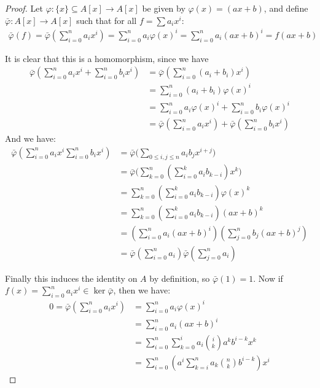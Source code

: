 \documentclass{article}
\theoremstyle{definition}
\theoremstyle{remark}
\theoremstyle{definition}
\begin{document}
    \begin{proof}
        Let $\varphi\colon \{x\}\subseteq A[x] \rightarrow A[x]$ be given by $\varphi(x) = (ax+b)$, and define $\bar\varphi\colon A[x]\rightarrow A[x]$ such that for all $f=\sum {a_i}x^i$:\begin{align}
            \bar\varphi(f) = \bar\varphi(\sum_{i=0}^n {a_i}x^i) = \sum_{i=0}^n {a_i}{\varphi(x)}^i = \sum_{i=0}^n {a_i}{(ax+b)}^i = f(ax+b)
        \end{align}

    It is clear that this is a homomorphism, since we have \begin{align}\bar\varphi(\sum_{i=0}^n {a_i}x^i + \sum_{i=0}^n {b_i}x^i) &= \bar\varphi(\sum_{i=0}^n ({a_i} + {b_i})x^i)\\
         &= \sum_{i=0}^n ({a_i} + {b_i}){\varphi(x)}^i\\
         &= \sum_{i=0}^n {a_i}{\varphi(x)}^i + \sum_{i=0}^n {b_i}{\varphi(x)}^i\\
         &= \bar\varphi(\sum_{i=0}^n {a_i}x^i) + \bar\varphi(\sum_{i=0}^n {b_i}x^i)
        \end{align}
And we have:\begin{align}
    \bar\varphi(\sum_{i=0}^n {a_i}x^i\sum_{i=0}^n {b_i}x^i) &= \bar\varphi\bigg(\sum_{0\leq i,j\leq n} {a_i}{b_j}x^{i+j}\bigg)\\
    &= \bar\varphi\bigg(\sum_{k=0}^n(\sum_{i=0}^k {a_i}b_{k-i}) x^k\bigg)\\
    &= \sum_{k=0}^n(\sum_{i=0}^k{a_i}{b_{k-i}}){\varphi(x)}^k\\
    &= \sum_{k=0}^n(\sum_{i=0}^k{a_i}{b_{k-i}}){(ax+b)}^k\\
    &= (\sum_{i=0}^n{a_i}{(ax+b)}^i)(\sum_{j=0}^n{b_{j}}{(ax+b)}^{j})\\
    &= \bar\varphi(\sum_{i=0}^n {a_i})\bar\varphi(\sum_{j=0}^n {a_i})
\end{align}

Finally this induces the identity on $A$ by definition, so $\bar\varphi(1) = 1$. Now if $f(x) = \sum_{i=0}^n{a_i}x^i\in \ker{\bar\varphi}$, then we have:\begin{align}
    0 = \bar\varphi (\sum_{i=0}^n {a_i}x^i) &= \sum_{i=0}^n{a_i}{\varphi(x)}^i\\
    &= \sum_{i=0}^n{a_i}{(ax+b)}^i\\
    &= \sum_{i=0}^n\sum_{k=0}^i{a_i}\binom{i}{k}{a^k}b^{i-k}{x^k}\\
    &= \sum_{i=0}^n({a^i}\sum_{k=i}^n{a_k}\binom{n}{k}b^{i-k})x^i
\end{align}


\end{proof}
\end{document}
